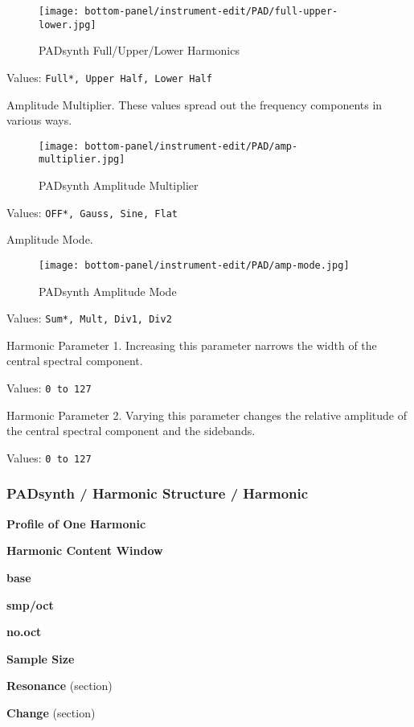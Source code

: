 \begin{figure}[H]
   \centering
   \texttt{[image: bottom-panel/instrument-edit/PAD/full-upper-lower.jpg]}
   \caption{PADsynth Full/Upper/Lower Harmonics}
   \label{fig:padsynth_full_upper_lower}
\end{figure}

   Values: \texttt{Full*, Upper Half, Lower Half}

   Amplitude Multiplier.
   These values spread out the frequency components in various ways.

\begin{figure}[H]
   \centering
   \texttt{[image: bottom-panel/instrument-edit/PAD/amp-multiplier.jpg]}
   \caption{PADsynth Amplitude Multiplier}
   \label{fig:padsynth_amplitude_multiplier}
\end{figure}

   Values: \texttt{OFF*, Gauss, Sine, Flat}

   Amplitude Mode.

\begin{figure}[H]
   \centering
   \texttt{[image: bottom-panel/instrument-edit/PAD/amp-mode.jpg]}
   \caption{PADsynth Amplitude Mode}
   \label{fig:padsynth_amplitude_mode}
\end{figure}

   Values: \texttt{Sum*, Mult, Div1, Div2}

   Harmonic Parameter 1.
   Increasing this parameter narrows the width of the central spectral
   component.

   Values: \texttt{0 to 127}

   Harmonic Parameter 2.
   Varying this parameter changes the relative amplitude of the central
   spectral component and the sidebands.

   Values: \texttt{0 to 127}

\subsubsection{PADsynth / Harmonic Structure / Harmonic}
\label{subsubsec:padsynth_harmonic_structure_harmonic}

   \begin{enumber}
      \item \textbf{Profile of One Harmonic}
      \item \textbf{Harmonic Content Window}
      \item \textbf{base}
      \item \textbf{smp/oct}
      \item \textbf{no.oct}
      \item \textbf{Sample Size}
      \item \textbf{Resonance} (section)
      \item \textbf{Change} (section)
   \end{enumber}

